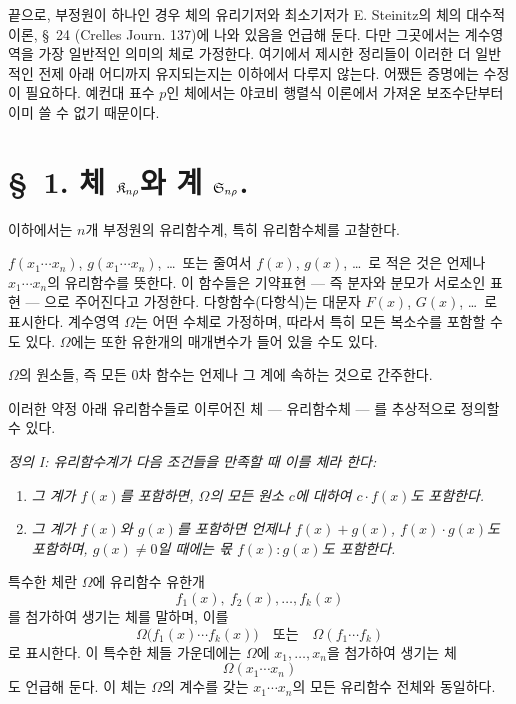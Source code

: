 끝으로, 부정원이 하나인 경우 체의 유리기저와 최소기저가 E. Steinitz의 \glqq{}체의 대수적 이론\grqq{}, \S\ 24 (Crelles Journ. 137)에 나와 있음을 언급해 둔다. 다만 그곳에서는 계수영역을 가장 일반적인 의미의 체로 가정한다. 여기에서 제시한 정리들이 이러한 더 일반적인 전제 아래 어디까지 유지되는지는 이하에서 다루지 않는다. 어쨌든 증명에는 수정이 필요하다. 예컨대 표수 $p$인 체에서는 야코비 행렬식 이론에서 가져온 보조수단부터 이미 쓸 수 없기 때문이다.

\section*{\S\ 1. 체 $\mathfrak K_{n\rho}$와 계 $\mathfrak S_{n\rho}$.}

이하에서는 $n$개 부정원의 유리함수계, 특히 유리함수체를 고찰한다.

$f(x_1\cdots x_n)$, $g(x_1\cdots x_n)$, \ldots\ 또는 줄여서 $f(x)$, $g(x)$, \ldots\ 로 적은 것은 언제나 $x_1\cdots x_n$의 유리함수를 뜻한다. 이 함수들은 기약표현 --- 즉 분자와 분모가 서로소인 표현 --- 으로 주어진다고 가정한다. 다항함수(다항식)는 대문자 $F(x)$, $G(x)$, \ldots\ 로 표시한다. 계수영역 $\Omega$는 어떤 수체로 가정하며, 따라서 특히 모든 복소수를 포함할 수도 있다. $\Omega$에는 또한 유한개의 매개변수가 들어 있을 수도 있다.

$\Omega$의 원소들, 즉 모든 0차 함수는 언제나 그 계에 속하는 것으로 간주한다.

이러한 약정 아래 유리함수들로 이루어진 체 --- 유리함수체 --- 를 추상적으로 정의할 수 있다.

\emph{정의 I: 유리함수계가 다음 조건들을 만족할 때 이를 체라 한다:}
\begin{enumerate}
\item \emph{그 계가 $f(x)$를 포함하면, $\Omega$의 모든 원소 $c$에 대하여 $c\cdot f(x)$도 포함한다.}
\item \emph{그 계가 $f(x)$와 $g(x)$를 포함하면 언제나 $f(x)+g(x)$, $f(x)\cdot g(x)$도 포함하며, $g(x)\ne0$일 때에는 몫 $f(x):g(x)$도 포함한다.}
\end{enumerate}
특수한 체란 $\Omega$에 유리함수 유한개
\[
  f_1(x),\ f_2(x),\ldots, f_k(x)
\]
를 첨가하여 생기는 체를 말하며, 이를
\[
  \Omega\bigl(f_1(x)\cdots f_k(x)\bigr)
  \quad\text{또는}\quad
  \Omega(f_1\cdots f_k)
\]
로 표시한다. 이 특수한 체들 가운데에는 $\Omega$에 $x_1,\ldots,x_n$을 첨가하여 생기는 체
\[
  \Omega(x_1\cdots x_n)
\]
도 언급해 둔다. 이 체는 $\Omega$의 계수를 갖는 $x_1\cdots x_n$의 모든 유리함수 전체와 동일하다.

